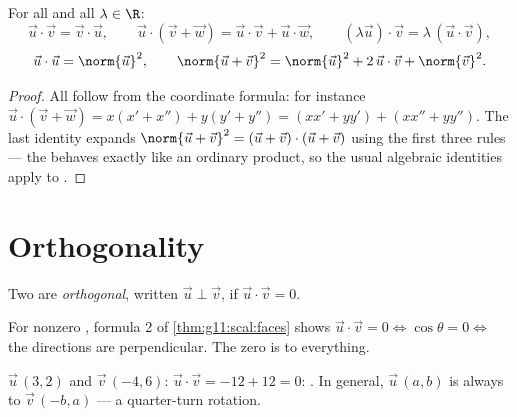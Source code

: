 \begin{proposition}\label{prop:g11:scal:rules}
For all  and all $\lambda \in \R$:
\[
\vec u \cdot \vec v = \vec v \cdot \vec u, \qquad
\vec u \cdot (\vec v + \vec w) = \vec u \cdot \vec v + \vec u \cdot
\vec w, \qquad
(\lambda \vec u)\cdot \vec v = \lambda\,(\vec u \cdot \vec v),
\]
\[
\vec u \cdot \vec u = \norm{\vec u}^2,
\qquad
\norm{\vec u + \vec v}^2 = \norm{\vec u}^2 + 2\,\vec u\cdot\vec v +
\norm{\vec v}^2 .
\]
\end{proposition}

\begin{proof}
All follow from the coordinate formula: for instance
$\vec u \cdot (\vec v + \vec w) = x(x' + x'') + y(y' + y'') =
(xx' + yy') + (xx'' + yy'')$. The last identity expands
$\norm{\vec u + \vec v}^2 = (\vec u + \vec v)\cdot(\vec u + \vec v)$
using the first three rules --- the  behaves exactly like an
ordinary product, so the usual algebraic identities apply to .
\end{proof}

\section{Orthogonality}

\begin{definition}\label{def:g11:scal:orthogonal}
Two  are \emph{orthogonal}, written
$\vec u \perp \vec v$, if $\vec u \cdot \vec v = 0$.
\end{definition}

\begin{remark}
For nonzero , formula 2 of \cref{thm:g11:scal:faces} shows
$\vec u \cdot \vec v = 0 \iff \cos\theta = 0 \iff$ the directions are
perpendicular. The zero  is  to everything.
\end{remark}

\begin{example}
$\vec u\,(3, 2)$ and $\vec v\,(-4, 6)$: $\vec u \cdot \vec v = -12 + 12 =
0$: . In general, $\vec u\,(a, b)$ is always  to
$\vec v\,(-b, a)$ --- a quarter-turn rotation.
\end{example}

